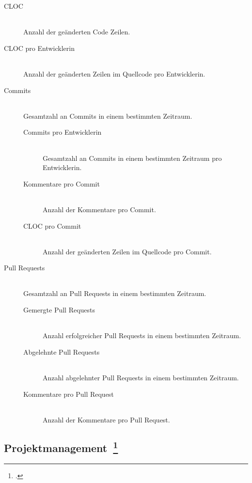 \begin{description}
  \item[\ac{CLOC}] \hfill \\ Anzahl der geänderten Code Zeilen.
  \item[\ac{CLOC} pro Entwicklerin] \hfill \\ Anzahl der geänderten Zeilen im Quellcode pro Entwicklerin.
  \item[Commits] \hfill \\ Gesamtzahl an Commits in einem bestimmten Zeitraum.
  \begin{description}
    \item[Commits pro Entwicklerin] \hfill \\ Gesamtzahl an Commits in einem bestimmten Zeitraum pro Entwicklerin.
    \item[Kommentare pro Commit] \hfill \\ Anzahl der Kommentare pro Commit.
    \item[\ac{CLOC} pro Commit] \hfill \\ Anzahl der geänderten Zeilen im Quellcode pro Commit.
  \end{description}
  \item[Pull Requests] \hfill \\ Gesamtzahl an Pull Requests in einem bestimmten Zeitraum.
  \begin{description}
    \item[Gemergte Pull Requests] \hfill \\ Anzahl erfolgreicher Pull Requests in einem bestimmten Zeitraum.
    \item[Abgelehnte Pull Requests] \hfill \\ Anzahl abgelehnter Pull Requests in einem bestimmten Zeitraum.
    \item[Kommentare pro Pull Request] \hfill \\ Anzahl der Kommentare pro Pull Request.
  \end{description}
\end{description}

\clearpage
\subsection[Projektmanagement]{Projektmanagement~\footcite[vgl.][S.37ff]{davis_agile_2015}}

